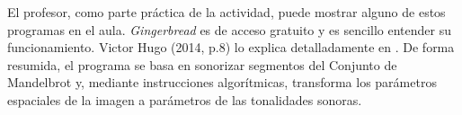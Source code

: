 \documentclass[a4paper, openright, 11pt, titlepage]{report}
\theoremstyle{definition}\newtheorem{defin}[propo]{Definition}
\theoremstyle{definition}\newtheorem{obser}[propo]{Remark}
\theoremstyle{definition}\newtheorem{ejem}[propo]{Ejemplo}
\theoremstyle{definition}\newtheorem{algoritmo}[propo]{Algoritmo}
\begin{document}
El profesor, como parte práctica de la actividad, puede mostrar alguno de estos programas en el aula. \textit{Gingerbread} es de acceso gratuito y es sencillo entender su funcionamiento. Victor Hugo (2014, p.8) lo explica detalladamente en \cite{gingerbread}. De forma resumida, el programa se basa en sonorizar segmentos del Conjunto de Mandelbrot y, mediante instrucciones algorítmicas, transforma los parámetros espaciales de la imagen a parámetros de las tonalidades sonoras.
\end{document}
